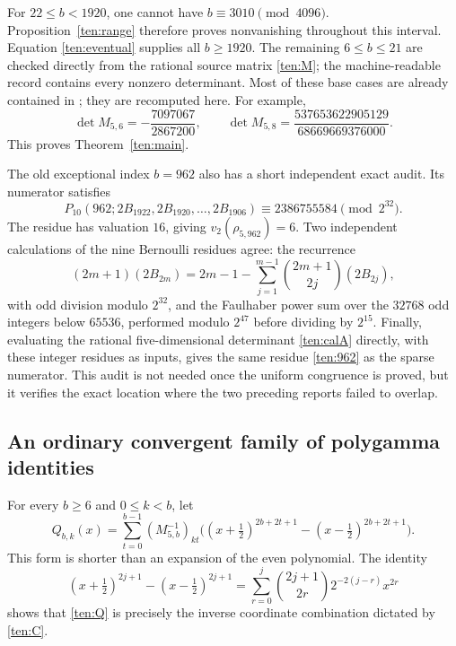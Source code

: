 \documentclass[11pt]{article}
\theoremstyle{definition}
\theoremstyle{remark}
\numberwithin{equation}{section}
\begin{document}
For $22\le b<1920$, one cannot have $b\equiv3010\pmod{4096}$.
Proposition~\ref{ten:range} therefore proves nonvanishing throughout
this interval.  Equation \eqref{ten:eventual} supplies all
$b\ge1920$.  The remaining $6\le b\le21$ are checked directly
from the rational source matrix \eqref{ten:M}; the machine-readable
record contains every nonzero determinant.  Most of these base cases
are already contained in \cite{AlternatingIncoming}; they are recomputed here.
For example,
\[
 \det M_{5,6}=-\frac{7097067}{2867200},\qquad
 \det M_{5,8}=\frac{537653622905129}{68669669376000}.
\]
This proves Theorem~\ref{ten:main}.

The old exceptional index $b=962$ also has a short independent exact
audit.  Its numerator satisfies
\begin{equation}\label{ten:962}
 P_{10}(962;2B_{1922},2B_{1920},\ldots,2B_{1906})
       \equiv2386755584\pmod{2^{32}}.
\end{equation}
The residue has valuation $16$, giving $v_2(\rho_{5,962})=6$.
Two independent calculations of the nine Bernoulli residues agree:
the recurrence
\[
 (2m+1)(2B_{2m})=2m-1-
        \sum_{j=1}^{m-1}\binom{2m+1}{2j}(2B_{2j}),
\]
with odd division modulo $2^{32}$, and the Faulhaber power sum over
the $32768$ odd integers below $65536$, performed modulo $2^{47}$
before dividing by $2^{15}$.  Finally, evaluating the rational
five-dimensional determinant \eqref{ten:calA} directly, with
these integer residues as inputs, gives the same residue
\eqref{ten:962} as the sparse numerator.  This audit is not needed
once the uniform congruence is proved, but it verifies the exact
location where the two preceding reports failed to overlap.

\subsection{An ordinary convergent family of polygamma identities}

For every $b\ge6$ and $0\le k<b$, let
\begin{equation}\label{ten:Q}
 Q_{b,k}(x)=\sum_{t=0}^{b-1}(M_{5,b}^{-1})_{kt}
       \bigl((x+\tfrac12)^{2b+2t+1}
                    -(x-\tfrac12)^{2b+2t+1}\bigr).
\end{equation}
This form is shorter than an expansion of the even polynomial.
The identity
\[
 (x+\tfrac12)^{2j+1}-(x-\tfrac12)^{2j+1}
 =\sum_{r=0}^{j}\binom{2j+1}{2r}2^{-2(j-r)}x^{2r}
\]
shows that \eqref{ten:Q} is precisely the inverse coordinate
combination dictated by \eqref{ten:C}.
\end{document}
